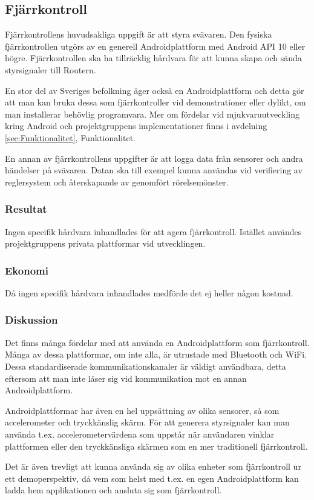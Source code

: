 \subsection{Fjärrkontroll}
Fjärrkontrollens huvudsakliga uppgift är att styra svävaren. Den fysiska
fjärrkontrollen utgörs av en generell Androidplattform med Android API 10 eller
högre. Fjärrkontrollen ska ha tillräcklig hårdvara för att kunna skapa
och sända styrsignaler till Routern.

En stor del av Sveriges befolkning äger också en Androidplattform och detta gör
att man kan bruka dessa som fjärrkontroller vid demonstrationer eller dylikt, om
man installerar behövlig programvara. Mer om fördelar vid mjukvaruutveckling kring
Android och projektgruppens implementationer finns i avdelning
\ref{sec:Funktionalitet}, Funktionalitet.

En annan av fjärrkontrollens uppgifter är att logga data från sensorer och andra
händelser på svävaren. Datan ska till exempel kunna användas vid verifiering av
reglersystem och återskapande av genomfört rörelsemönster.

\subsubsection{Resultat}
Ingen specifik hårdvara inhandlades för att agera fjärrkontroll. Istället
användes projektgruppens privata plattformar vid utvecklingen.

\subsubsection{Ekonomi}
Då ingen specifik hårdvara inhandlades medförde det ej heller någon kostnad.

\subsubsection{Diskussion}
Det finns många fördelar med att använda en Androidplattform som fjärrkontroll.
Många av dessa plattformar, om inte alla, är utrustade med Bluetooth och
WiFi. Dessa standardiserade kommunikationskanaler är väldigt användbara,
detta eftersom att man inte låser sig vid kommunikation mot en annan
Androidplattform.

Androidplattformar har även en hel uppsättning av olika sensorer, så som
accelerometer och tryckkänslig skärm. För att generera styrsignaler kan man
använda t.ex. accelerometervärdena som uppstår när användaren vinklar
plattformen eller den tryckkänsliga skärmen som en mer traditionell fjärrkontroll.

Det är även trevligt att kunna använda sig av olika enheter som fjärrkontroll ur
ett demoperspektiv, då vem som helst med t.ex. en egen Androidplattform kan
ladda hem applikationen och ansluta sig som fjärrkontroll.
